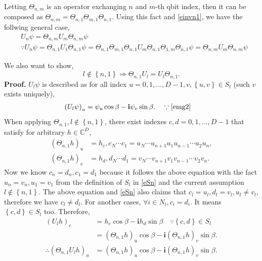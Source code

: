 \documentclass[a4paper]{article}
\newcommand{\eqlabel}[1]{\label{#1}}
\newcommand{\br}[1]{\left(#1\right)}
\newcommand{\cbr}[1]{\left\{#1\right\}}
\newcommand{\sC}{\mathbb{C}}
\newcommand{\ci}{\mathbf{i}}
\begin{document}
Letting \(\Theta_{n, m}\) is an operator exchanging \(n\) and \(m\)-th qbit index, then it can be composed as \(\Theta_{n, m} = \Theta_{n, 1}\Theta_{m, 1}\Theta_{n, 1}\). Using this fact and \eqref{einvn1}, we have the follwing general case,
\begin{align}
    \eqlabel{e1nm}
    &U_n \psi = \Theta_{n, m}  U_{m} \Theta_{n, m}\psi\\
    \nonumber
    &\because U_n \psi=\Theta_{n, 1} U_{1} \Theta_{n, 1}\psi = \Theta_{n, 1} \Theta_{m, 1}\Theta_{n, 1} U_{m} \Theta_{n, 1}\Theta_{1, m}\Theta_{n, 1}\psi = \Theta_{n, m}  U_{m} \Theta_{n, m}\psi 
\end{align}

We also want to show,
\begin{equation}
    \eqlabel{eln1}
l \not\in\cbr{n, 1}\Rightarrow \Theta_{n, 1} U_l = U_l \Theta_{n, 1}.
\end{equation}
\textbf{Proof.}  \( U_l \psi\) is described as for all index \(u = 0,1,...,{D-1}, v, \cbr{u, v}\in S_l\) (such \(v\) exists uniquely),
\begin{align*}
    \br{U_l \psi}_u &= \psi_u \cos\beta - \ci\psi_v \sin \beta.\quad\because \eqref{emg2}
\end{align*}
When applying \(\Theta_{n, 1}, l\not\in\cbr{n, 1}\), there exist indexes \(c, d=0,1,...,D-1\) that satisfy for arbitrary \(h\in\sC^D\), 
\begin{align*}
    \br{\Theta_{n, 1}h}_{u} &= h_{c}, c_N\cdots c_1 = u_N\cdots u_{n+1}u_1 u_{n-1}\cdots u_2 u_n,\\
    \br{\Theta_{n, 1}h}_{v} &= h_{d}, d_N\cdots d_1 = v_N\cdots v_{n+1}v_1 v_{n-1}\cdots v_2 v_n.
\end{align*}
Now we know \(c_n=d_n, c_1=d_1\) because it follows the above equation with the fact \(u_n = v_n, u_1=v_1\) from the definition of \(S_l\) in \eqref{eSn} and the current assumption \(l\not\in \cbr{n, 1}\). The above equation and \eqref{eSn} also claims that \(c_l = u_l, d_l= v_l, u_l\neq v_l\), therefore we have \(c_l\neq d_l\). For another cases, \(\forall i\in N_l,  c_i=d_i\). It means \(\cbr{c, d}\in S_l\) too. Therefore,
\begin{align*}
    \br{U_l h}_{c} & = h_c \cos\beta - \ci h_d \sin \beta\quad \because \cbr{c, d}\in S_l\\
    &= \br{\Theta_{n, 1} h}_u\cos\beta - \ci\br{\Theta_{n, 1}h}_v \sin \beta.\\
   \therefore \br{\Theta_{n,1} U_l h}_{u} & = \br{\Theta_{n, 1} h}_u\cos\beta - \ci\br{\Theta_{n, 1}h}_v \sin \beta.
\end{align*}
\end{document}
